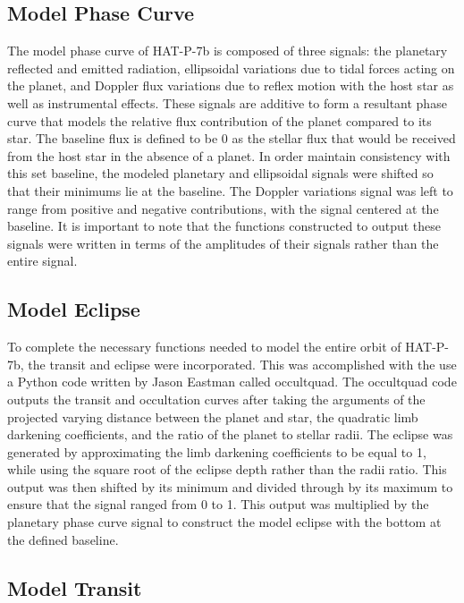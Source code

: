 \documentclass[manuscript]{aastex}
\begin{document}
\subsection{Model Phase Curve}

	The model phase curve of HAT-P-7b is composed of three signals: the planetary reflected and emitted radiation, ellipsoidal variations due to tidal forces acting on the planet, and Doppler flux variations due to reflex motion with the host star as well as instrumental effects. These signals are additive to form a resultant phase curve that models the relative flux contribution of the planet compared to its star. The baseline flux is defined to be 0 as the stellar flux that would be received from the host star in the absence of a planet. In order maintain consistency with this set baseline, the modeled planetary and ellipsoidal signals were shifted so that their minimums lie at the baseline. The Doppler variations signal was left to range from positive and negative contributions, with the signal centered at the baseline. It is important to note that the functions constructed to output these signals were written in terms of the amplitudes of their signals rather than the entire signal.

\subsection{Model Eclipse}

    To complete the necessary functions needed to model the entire orbit of HAT-P-7b, the transit and eclipse were incorporated. This was accomplished with the use a Python code written by Jason Eastman called occultquad. The occultquad code outputs the transit and occultation curves after taking the arguments of the projected varying distance between the planet and star, the quadratic limb darkening coefficients, and the ratio of the planet to stellar radii. 
    The eclipse was generated by approximating the limb darkening coefficients to be equal to 1, while using the square root of the eclipse depth rather than the radii ratio. This output was then shifted by its minimum and divided through by its maximum to ensure that the signal ranged from 0 to 1. This output was multiplied by the planetary phase curve signal to construct the model eclipse with the bottom at the defined baseline.
    
\subsection{Model Transit}
\end{document}
